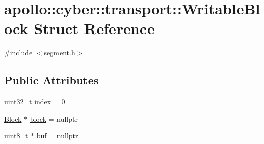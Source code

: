 \hypertarget{structapollo_1_1cyber_1_1transport_1_1WritableBlock}{\section{apollo\-:\-:cyber\-:\-:transport\-:\-:Writable\-Block Struct Reference}
\label{structapollo_1_1cyber_1_1transport_1_1WritableBlock}
}


{\ttfamily \#include $<$segment.\-h$>$}

\subsection*{Public Attributes}
\begin{DoxyCompactItemize}
\item 
uint32\-\_\-t \hyperlink{structapollo_1_1cyber_1_1transport_1_1WritableBlock_adcffe4e278eab8879135e0def760e60b}{index} = 0
\item 
\hyperlink{classapollo_1_1cyber_1_1transport_1_1Block}{Block} $\ast$ \hyperlink{structapollo_1_1cyber_1_1transport_1_1WritableBlock_af10f17500693ff4dffedbb56f8b26119}{block} = nullptr
\item 
uint8\-\_\-t $\ast$ \hyperlink{structapollo_1_1cyber_1_1transport_1_1WritableBlock_a2e82d782aa6e76c40a0ee083dae061f5}{buf} = nullptr
\end{DoxyCompactItemize}


